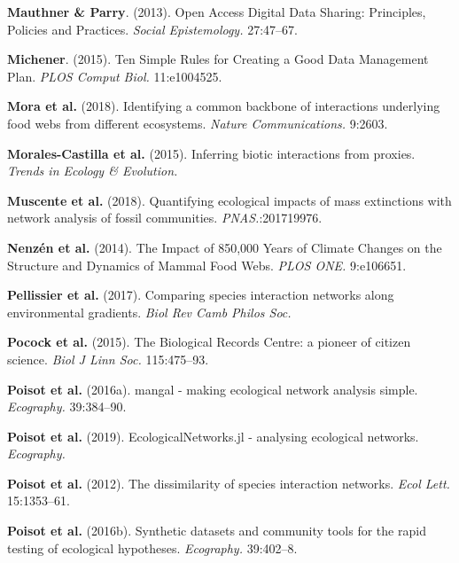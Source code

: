 \leavevmode\hypertarget{ref-MautParr13}{}%
\textbf{Mauthner \& Parry}. (2013). Open Access Digital Data Sharing:
Principles, Policies and Practices. \emph{Social Epistemology.}
27:47--67.

\leavevmode\hypertarget{ref-Mich15}{}%
\textbf{Michener}. (2015). Ten Simple Rules for Creating a Good Data
Management Plan. \emph{PLOS Comput Biol.} 11:e1004525.

\leavevmode\hypertarget{ref-MoraGrav18}{}%
\textbf{Mora et al.} (2018). Identifying a common backbone of
interactions underlying food webs from different ecosystems.
\emph{Nature Communications.} 9:2603.

\leavevmode\hypertarget{ref-MoraMati15}{}%
\textbf{Morales-Castilla et al.} (2015). Inferring biotic interactions
from proxies. \emph{Trends in Ecology \& Evolution.}

\leavevmode\hypertarget{ref-MuscPrab18}{}%
\textbf{Muscente et al.} (2018). Quantifying ecological impacts of mass
extinctions with network analysis of fossil communities.
\emph{PNAS.}:201719976.

\leavevmode\hypertarget{ref-NenzMont14}{}%
\textbf{Nenzén et al.} (2014). The Impact of 850,000 Years of Climate
Changes on the Structure and Dynamics of Mammal Food Webs. \emph{PLOS
ONE.} 9:e106651.

\leavevmode\hypertarget{ref-PellAlbo17}{}%
\textbf{Pellissier et al.} (2017). Comparing species interaction
networks along environmental gradients. \emph{Biol Rev Camb Philos Soc.}

\leavevmode\hypertarget{ref-PocoRoy15}{}%
\textbf{Pocock et al.} (2015). The Biological Records Centre: a pioneer
of citizen science. \emph{Biol J Linn Soc.} 115:475--93.

\leavevmode\hypertarget{ref-PoisBais16}{}%
\textbf{Poisot et al.} (2016a). mangal - making ecological network
analysis simple. \emph{Ecography.} 39:384--90.

\leavevmode\hypertarget{ref-PoisBeli19}{}%
\textbf{Poisot et al.} (2019). EcologicalNetworks.jl - analysing
ecological networks. \emph{Ecography.}

\leavevmode\hypertarget{ref-PoisCana12}{}%
\textbf{Poisot et al.} (2012). The dissimilarity of species interaction
networks. \emph{Ecol Lett.} 15:1353--61.

\leavevmode\hypertarget{ref-PoisGrav16}{}%
\textbf{Poisot et al.} (2016b). Synthetic datasets and community tools
for the rapid testing of ecological hypotheses. \emph{Ecography.}
39:402--8.

